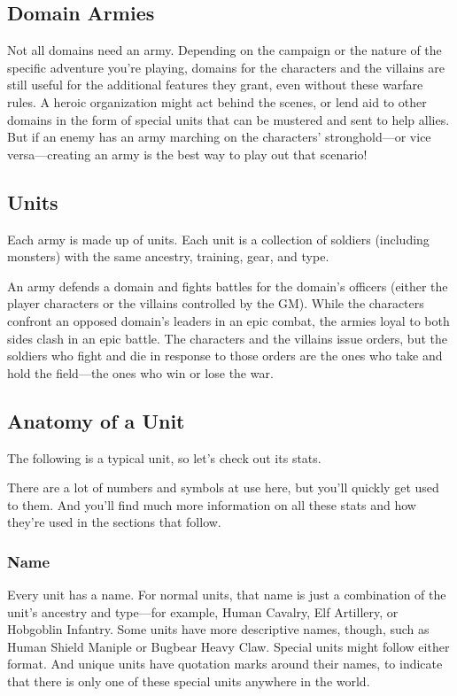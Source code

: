 \documentclass[10pt,a4paper,twoside,bg=print,twocolumn,openany,nodeprecatedcode]{dndbook}
\begin{document}
\subsection{Domain Armies}
Not all domains need an army. Depending on the campaign or the nature of the specific adventure you're playing, domains for the characters and the villains are still useful for the additional features they grant, even without these warfare rules. A heroic organization might act behind the scenes, or lend aid to other domains in the form of special units that can be mustered and sent to help allies. But if an enemy has an army marching on the characters' stronghold—or vice versa—creating an army is the best way to play out that scenario!

\subsection{Units}
Each army is made up of units. Each unit is a collection of soldiers (including monsters) with the same ancestry, training, gear, and type.

An army defends a domain and fights battles for the domain's officers (either the player characters or the villains controlled by the GM). While the characters confront an opposed domain's leaders in an epic combat, the armies loyal to both sides clash in an epic battle. The characters and the villains issue orders, but the soldiers who fight and die in response to those orders are the ones who take and hold the field—the ones who win or lose the war.

\subsection{Anatomy of a Unit}
The following is a typical unit, so let's check out its stats.

There are a lot of numbers and symbols at use here, but you'll quickly get used to them. And you'll find much more information on all these stats and how they're used in the sections that follow.

\subsubsection{Name}
Every unit has a name. For normal units, that name is just a combination of the unit's ancestry and type—for example, Human Cavalry, Elf Artillery, or Hobgoblin Infantry. Some units have more descriptive names, though, such as Human Shield Maniple or Bugbear Heavy Claw. Special units might follow either format. And unique units have quotation marks around their names, to indicate that there is only one of these special units anywhere in the world.
\end{document}

